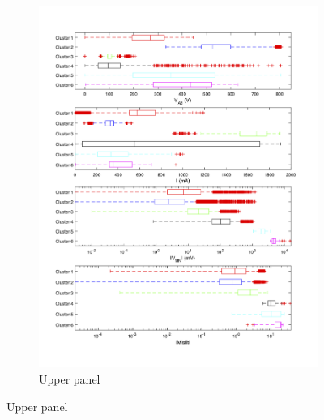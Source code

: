 \documentclass[final,authoryear,5p,times,twocolumn]{elsarticle}
\begin{document}
\begin{figure}[!ht]
   \centering

   \begin{subfigure}[b]{0.86\linewidth}
       \centering
       \includegraphics[trim=1cm 1.5cm 2cm 2cm, clip=true, width=\linewidth]{./Figures/Fig13a.png}
       \caption{Upper panel}
       \label{fig:AB_Mixed_MN_Cable2_Cluster_PropBoxPlot1}
   \end{subfigure}

   \vspace{1em}


\end{figure}
\end{document}
